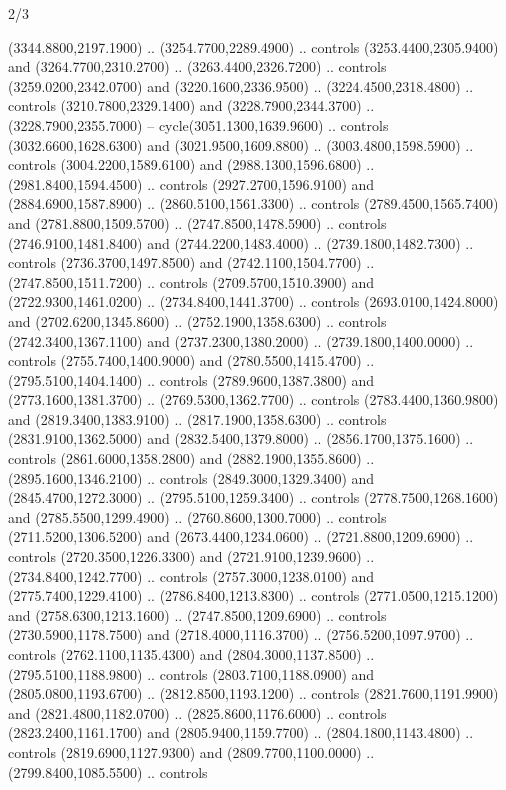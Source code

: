 \begin{flagdescription}{2/3}
\begin{scope}[shift={(0.5\flaglength,0.5)},scale=\flagwidth/130]
\begin{scope}[y=0.01mm, x=0.01mm,shift={(-3365,-2250)}]
  (3344.8800,2197.1900) .. (3254.7700,2289.4900) .. controls
  (3253.4400,2305.9400) and (3264.7700,2310.2700) .. (3263.4400,2326.7200) ..
  controls (3259.0200,2342.0700) and (3220.1600,2336.9500) ..
  (3224.4500,2318.4800) .. controls (3210.7800,2329.1400) and
  (3228.7900,2344.3700) .. (3228.7900,2355.7000) -- cycle(3051.1300,1639.9600)
  .. controls (3032.6600,1628.6300) and (3021.9500,1609.8800) ..
  (3003.4800,1598.5900) .. controls (3004.2200,1589.6100) and
  (2988.1300,1596.6800) .. (2981.8400,1594.4500) .. controls
  (2927.2700,1596.9100) and (2884.6900,1587.8900) .. (2860.5100,1561.3300) ..
  controls (2789.4500,1565.7400) and (2781.8800,1509.5700) ..
  (2747.8500,1478.5900) .. controls (2746.9100,1481.8400) and
  (2744.2200,1483.4000) .. (2739.1800,1482.7300) .. controls
  (2736.3700,1497.8500) and (2742.1100,1504.7700) .. (2747.8500,1511.7200) ..
  controls (2709.5700,1510.3900) and (2722.9300,1461.0200) ..
  (2734.8400,1441.3700) .. controls (2693.0100,1424.8000) and
  (2702.6200,1345.8600) .. (2752.1900,1358.6300) .. controls
  (2742.3400,1367.1100) and (2737.2300,1380.2000) .. (2739.1800,1400.0000) ..
  controls (2755.7400,1400.9000) and (2780.5500,1415.4700) ..
  (2795.5100,1404.1400) .. controls (2789.9600,1387.3800) and
  (2773.1600,1381.3700) .. (2769.5300,1362.7700) .. controls
  (2783.4400,1360.9800) and (2819.3400,1383.9100) .. (2817.1900,1358.6300) ..
  controls (2831.9100,1362.5000) and (2832.5400,1379.8000) ..
  (2856.1700,1375.1600) .. controls (2861.6000,1358.2800) and
  (2882.1900,1355.8600) .. (2895.1600,1346.2100) .. controls
  (2849.3000,1329.3400) and (2845.4700,1272.3000) .. (2795.5100,1259.3400) ..
  controls (2778.7500,1268.1600) and (2785.5500,1299.4900) ..
  (2760.8600,1300.7000) .. controls (2711.5200,1306.5200) and
  (2673.4400,1234.0600) .. (2721.8800,1209.6900) .. controls
  (2720.3500,1226.3300) and (2721.9100,1239.9600) .. (2734.8400,1242.7700) ..
  controls (2757.3000,1238.0100) and (2775.7400,1229.4100) ..
  (2786.8400,1213.8300) .. controls (2771.0500,1215.1200) and
  (2758.6300,1213.1600) .. (2747.8500,1209.6900) .. controls
  (2730.5900,1178.7500) and (2718.4000,1116.3700) .. (2756.5200,1097.9700) ..
  controls (2762.1100,1135.4300) and (2804.3000,1137.8500) ..
  (2795.5100,1188.9800) .. controls (2803.7100,1188.0900) and
  (2805.0800,1193.6700) .. (2812.8500,1193.1200) .. controls
  (2821.7600,1191.9900) and (2821.4800,1182.0700) .. (2825.8600,1176.6000) ..
  controls (2823.2400,1161.1700) and (2805.9400,1159.7700) ..
  (2804.1800,1143.4800) .. controls (2819.6900,1127.9300) and
  (2809.7700,1100.0000) .. (2799.8400,1085.5500) .. controls

\end{scope}
\end{scope}
\end{flagdescription}

